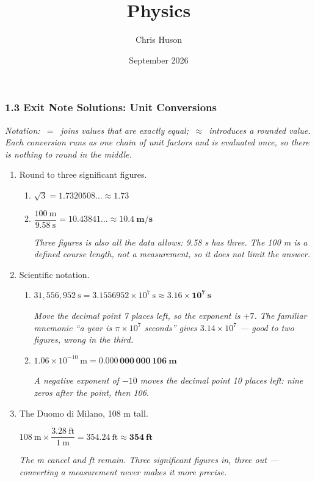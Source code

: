 \documentclass[12pt, twoside]{article}
\title{Physics}
\author{Chris Huson}
\date{September 2026}
\begin{document}
\subsubsection*{1.3 Exit Note Solutions: Unit Conversions}

\emph{Notation: \,$=$\, joins values that are exactly equal; \,$\approx$\, introduces a
rounded value. Each conversion runs as one chain of unit factors and is evaluated once,
so there is nothing to round in the middle.}

\begin{enumerate}[itemsep=0.25cm]

\item Round to three significant figures.
  \begin{enumerate}[itemsep=0.2cm]
    \item $\sqrt{3} = 1.7320508\ldots \approx \mathbf{1.73}$
    \item $\dfrac{100~\text{m}}{9.58~\text{s}} = 10.43841\ldots \approx \mathbf{10.4~\textbf{m/s}}$

      \emph{Three figures is also all the data allows: 9.58 s has three. The 100 m is a
      defined course length, not a measurement, so it does not limit the answer.}
  \end{enumerate}

\item Scientific notation.
  \begin{enumerate}[itemsep=0.2cm]
    \item $31{,}556{,}952~\text{s} = 3.1556952 \times 10^{7}~\text{s}
      \approx \mathbf{3.16 \times 10^{7}~\textbf{s}}$

      \emph{Move the decimal point 7 places left, so the exponent is $+7$. The familiar
      mnemonic ``a year is $\pi \times 10^{7}$ seconds'' gives $3.14 \times 10^{7}$ ---
      good to two figures, wrong in the third.}
    \item $1.06 \times 10^{-10}~\text{m} = \mathbf{0.000\,000\,000\,106~\textbf{m}}$

      \emph{A negative exponent of $-10$ moves the decimal point 10 places left: nine
      zeros after the point, then 106.}
  \end{enumerate}

\item The Duomo di Milano, 108 m tall.

  $108~\text{m} \times \dfrac{3.28~\text{ft}}{1~\text{m}} = 354.24~\text{ft}
  \approx \mathbf{354~\textbf{ft}}$

  \emph{The m cancel and ft remain. Three significant figures in, three out ---
  converting a measurement never makes it more precise.}


\end{enumerate}
\end{document}
